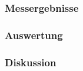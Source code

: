 \documentclass[12pt,a4paper]{article}
\begin{document}
\subsubsection*{Messergebnisse}
\subsubsection*{Auswertung}
\subsubsection*{Diskussion}
\end{document}
